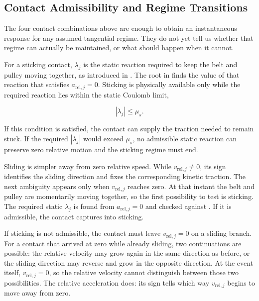 \documentclass[11pt]{report}
\numberwithin{equation}{section}
\begin{document}
\subsection{Contact Admissibility and Regime Transitions}
\label{sec:contact_admissibility_transitions}

The four contact combinations above are enough to obtain an instantaneous
response for any assumed tangential regime. They do not yet tell us whether
that regime can actually be maintained, or what should happen when it cannot.

For a sticking contact, \(\lambda_j\) is the static reaction required to keep
the belt and pulley moving together, as introduced in
. The root in
 finds the value of that reaction that
satisfies \(a_{\mathrm{rel},j}=0\). Sticking is physically available only while the
required reaction lies within the static Coulomb limit,

\begin{equation}
    \left|\lambda_j\right|\leq\mu_s .
\label{eq:sticking_admissibility}
\end{equation}

If this condition is satisfied, the contact can supply the traction needed to
remain stuck. If the required \(\left|\lambda_j\right|\) would exceed
\(\mu_s\), no admissible static reaction can preserve zero relative motion and
the sticking regime must end.

Sliding is simpler away from zero relative speed. While
\(v_{\mathrm{rel},j}\neq0\), its sign identifies the sliding direction and
 fixes the corresponding kinetic
traction. The next ambiguity appears only when \(v_{\mathrm{rel},j}\) reaches
zero. At that instant the belt and pulley are momentarily moving together, so
the first possibility to test is sticking. The required static
\(\lambda_j\) is found from \(a_{\mathrm{rel},j}=0\) and checked against
. If it is admissible, the contact captures
into sticking.

If sticking is not admissible, the contact must leave
\(v_{\mathrm{rel},j}=0\) on a sliding branch. For a contact that arrived at
zero while already sliding, two continuations are possible: the relative
velocity may grow again in the same direction as before, or the sliding
direction may reverse and grow in the opposite direction. At the event itself,
\(v_{\mathrm{rel},j}=0\), so the relative velocity cannot distinguish between
those two possibilities. The relative acceleration does: its sign tells which
way \(v_{\mathrm{rel},j}\) begins to move away from zero.
\end{document}

